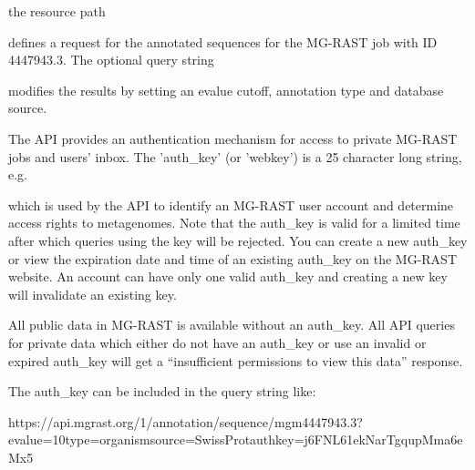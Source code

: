 \documentclass[letterpaper,10pt,english]{sphinxmanual}
\begin{document}
the resource path

\begin{sphinxVerbatim}[commandchars=\\\{\}]
\end{sphinxVerbatim}

defines a request for the annotated sequences for the MG-RAST job with
ID 4447943.3. The optional query string

\begin{sphinxVerbatim}[commandchars=\\\{\}]
\end{sphinxVerbatim}

modifies the results by setting an evalue cutoff, annotation type and
database source.

The API provides an authentication mechanism for access to private
MG-RAST jobs and users’ inbox. The ’auth\_key’ (or ’webkey’) is a 25
character long string, e.g.

\begin{sphinxVerbatim}[commandchars=\\\{\}]
\end{sphinxVerbatim}

which is used by the API to identify an MG-RAST user account and
determine access rights to metagenomes. Note that the auth\_key is valid
for a limited time after which queries using the key will be rejected.
You can create a new auth\_key or view the expiration date and time of an
existing auth\_key on the MG-RAST website. An account can have only one
valid auth\_key and creating a new key will invalidate an existing key.

All public data in MG-RAST is available without an auth\_key. All API
queries for private data which either do not have an auth\_key or use an
invalid or expired auth\_key will get a “insufficient permissions to view
this data” response.

The auth\_key can be included in the query string like:

\begin{sphinxVerbatim}[commandchars=\\\{\}]
https://api.mg\PYGZhy{}rast.org/1/annotation/sequence/mgm4447943.3?evalue=10\PYGZam{}type=organism\PYGZam{}source=SwissProt\PYGZam{}auth\PYGZus{}key=j6FNL61ekNarTgqupMma6eMx5
\end{sphinxVerbatim}
\end{document}
